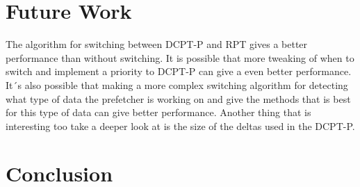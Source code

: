 \documentclass[journal,a4paper]{IEEEtran}
\begin{document}
\section{Future Work}
The algorithm for switching between DCPT-P and RPT gives a better performance than
without switching. It is possible that more tweaking of when to switch and implement
a priority to DCPT-P can give a even better performance. It´s also possible that making
a more complex switching algorithm for detecting what type of data the prefetcher is
working on and give the methods that is best for this type of data can give better
performance. Another thing that is interesting too take a deeper look at is the size of
the deltas used in the DCPT-P. 

\section{Conclusion}

\end{document}
